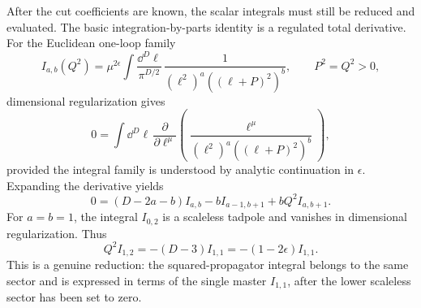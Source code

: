 After the cut coefficients are known, the scalar integrals must still be
reduced and evaluated.  The basic integration-by-parts identity is a regulated
total derivative.  For the Euclidean one-loop family
\begin{equation}
  I_{a,b}(Q^2)
  =
  \mu^{2\epsilon}
  \int\frac{\dd^D\ell}{\pi^{D/2}}\,
  \frac1{(\ell^2)^a((\ell+P)^2)^b},
  \qquad P^2=Q^2>0 ,
  \label{eq:bubble-ibp-family}
\end{equation}
dimensional regularization gives
\begin{equation}
  0=
  \int\dd^D\ell\,
  \frac{\partial}{\partial\ell^\mu}
  \left(
    \frac{\ell^\mu}{(\ell^2)^a((\ell+P)^2)^b}
  \right),
  \label{eq:bubble-total-derivative-ibp}
\end{equation}
provided the integral family is understood by analytic continuation in
\(\epsilon\).  Expanding the derivative yields
\begin{equation}
  0
  =
  (D-2a-b)I_{a,b}
  -bI_{a-1,b+1}
  +bQ^2I_{a,b+1}.
  \label{eq:bubble-ibp-general-identity}
\end{equation}
For \(a=b=1\), the integral \(I_{0,2}\) is a scaleless tadpole and vanishes in
dimensional regularization.  Thus
\begin{equation}
  Q^2 I_{1,2}
  =
  -(D-3)I_{1,1}
  =
  -(1-2\epsilon)I_{1,1}.
  \label{eq:bubble-ibp-square-propagator-reduction}
\end{equation}
This is a genuine reduction: the squared-propagator integral belongs to the
same sector and is expressed in terms of the single master \(I_{1,1}\), after
the lower scaleless sector has been set to zero.

